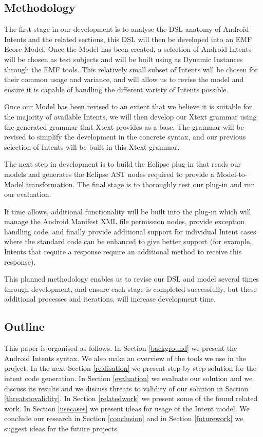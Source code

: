 \subsection{Methodology}
The first stage in our development is to analyse the DSL anatomy of Android Intents and the related sections, this DSL will then be developed into an EMF Ecore Model. Once the Model has been created, a selection of Android Intents will be chosen as test subjects and will be built using as Dynamic Instances through the EMF tools. This relatively small subset of Intents will be chosen for their common usage and variance, and will allow us to revise the model and ensure it is capable of handling the different variety of Intents possible.

Once our Model has been revised to an extent that we believe it is suitable for the majority of available Intents, we will then develop our Xtext grammar using the generated grammar that Xtext provides as a base. The grammar will be revised to simplify the development in the concrete syntax, and our previous selection of Intents will be built in this Xtext grammar.

The next step in development is to build the Eclipse plug-in that reads our models and generates the Eclipse AST nodes required to provide a Model-to-Model transformation. The final stage is to thoroughly test our plug-in and run our evaluation.

If time allows, additional functionality will be built into the plug-in which will manage the Android Manifest XML file permission nodes, provide exception handling code, and finally provide additional support for individual Intent cases where the standard code can be enhanced to give better support (for example, Intents that require a response require an additional method to receive this response).

This planned methodology enables us to revise our DSL and model several times through development, and ensure each stage is completed successfully, but these additional processes and iterations, will increase development time.

\subsection{Outline}
This paper is organised as follows. In Section \ref{background} we present the 
Android Intents syntax. We also make an overview of the tools we use in the project. In the next Section \ref{realisation} we present step-by-step solution for the intent code generation. In Section \ref{evaluation} we evaluate our solution and we discuss its results and we discuss threats to validity of our solution in Section \ref{threatstovalidity}. In Section \ref{relatedwork} we present some of the found related work. In Section \ref{usecases} we present ideas for usage of the Intent model. We conclude our research in Section \ref{conclusion} and in Section \ref{futurework} we suggest ideas for the future projects.